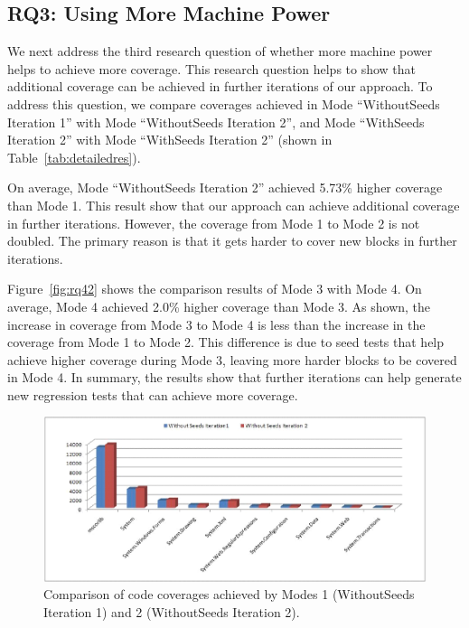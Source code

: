 
\subsection{RQ3: Using More Machine Power}

We next address the third research question of whether more machine power helps to achieve more coverage. This research question helps to show that additional coverage can be achieved in further iterations of our approach. To address this question, we compare coverages achieved in Mode ``WithoutSeeds Iteration 1'' with Mode ``WithoutSeeds Iteration 2'', and Mode ``WithSeeds Iteration 2'' with Mode ``WithSeeds Iteration 2'' (shown in Table~\ref{tab:detailedres}). 

On average, Mode ``WithoutSeeds Iteration 2'' achieved 5.73\% higher coverage than Mode 1. This result show that our approach can achieve additional coverage in further iterations. However, the coverage from Mode 1 to Mode 2 is not doubled. The primary reason is that it gets harder to cover new blocks in further iterations.

Figure~\ref{fig:rq42} shows the comparison results of Mode 3 with Mode 4. On average, Mode 4 achieved 2.0\% higher coverage than Mode 3. As shown, the increase in coverage from Mode 3 to Mode 4 is less than the increase in the coverage from Mode 1 to Mode 2. This difference is due to seed tests that help achieve higher coverage during Mode 3, leaving more harder blocks to be covered in Mode 4. In summary, the results show that further iterations can help generate new regression tests that can achieve more coverage.

\begin{figure}[t]
\centering
\includegraphics[scale=0.70,clip]{figs/RQ4_1_1.eps}\vspace*{-1ex}
\caption{\label{fig:rq41}Comparison of code coverages achieved by Modes 1 (WithoutSeeds Iteration 1) and 2 (WithoutSeeds Iteration 2).} 
\end{figure}


